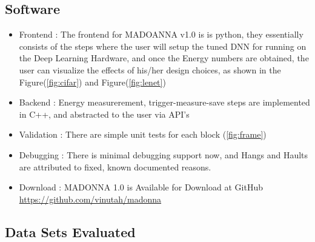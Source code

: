 \documentclass[letterpaper, 10 pt, conference]{ieeeconf}
\begin{document}
\subsection{Software}

\begin{itemize}
  \item Frontend   : The frontend for MADOANNA v1.0 is is python, they essentially consists of the steps where the user
        will setup the tuned DNN for running on the Deep Learning Hardware, and once the Energy numbers are obtained, 
        the user can visualize the effects of his/her design choices, as shown in the Figure(\ref{fig:cifar}) and Figure(\ref{fig:lenet})
  \item Backend    : Energy measurerement, trigger-measure-save steps are implemented in C++, and abstracted to the user via API's
  \item Validation : There are simple unit tests for each block (\ref{fig:frame})
  \item Debugging  : There is minimal debugging support now, and Hangs and Haults are attributed to fixed, known documented reasons.
  \item Download   : MADONNA 1.0 is Available for Download at GitHub \url{https://github.com/vinutah/madonna}

  \end{itemize}

  \subsection{Data Sets Evaluated}
\end{document}
